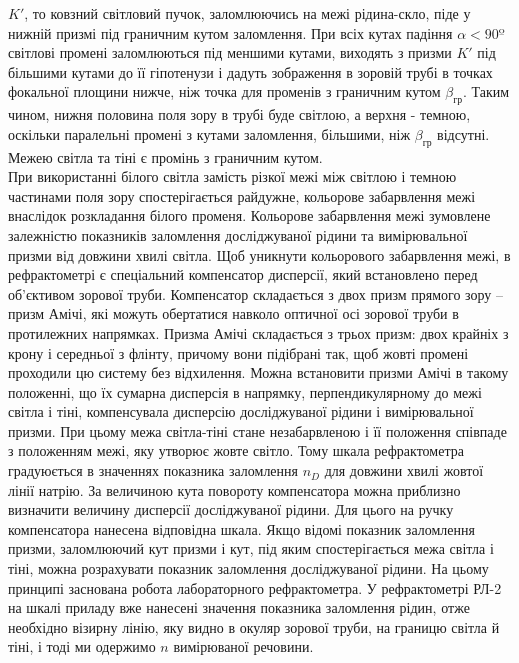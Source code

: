 $K'$, то ковзний світловий пучок, заломлюючись на межі рідина-скло, піде у нижній призмі під граничним кутом заломлення. При всіх кутах падіння $\alpha<90º$ світлові промені заломлюються під меншими кутами, виходять з призми $K'$ під більшими кутами до її гіпотенузи і дадуть зображення в зоровій трубі в точках фокальної площини нижче, ніж точка для променів з граничним кутом ${\beta}_{гр}$. Таким чином, нижня половина поля зору в трубі буде світлою, а верхня - темною, оскільки паралельні промені з кутами заломлення, більшими, ніж ${\beta}_{гр}$ відсутні. Межею світла та тіні є промінь з
граничним кутом. \\
При використанні білого світла замість різкої межі між світлою і темною частинами поля зору спостерігається райдужне, кольорове забарвлення межі внаслідок розкладання білого променя. Кольорове забарвлення межі зумовлене залежністю показників заломлення досліджуваної рідини та вимірювальної призми від довжини хвилі світла.
Щоб уникнути кольорового забарвлення межі, в рефрактометрі є спеціальний компенсатор дисперсії, який встановлено перед об’єктивом зорової труби. Компенсатор складається з двох призм прямого зору – призм Амічі, які можуть обертатися навколо оптичної осі зорової труби в протилежних напрямках. Призма Амічі складається з трьох призм: двох крайніх з крону і середньої з флінту, причому вони підібрані так, щоб жовті промені проходили цю систему без відхилення. Можна встановити призми Амічі в такому положенні, що їх сумарна дисперсія в напрямку, перпендикулярному до межі світла і тіні, компенсувала дисперсію досліджуваної рідини і вимірювальної призми. При цьому межа світла-тіні стане незабарвленою і її положення співпаде з положенням межі, яку утворює жовте світло. Тому шкала рефрактометра градуюється
в значеннях показника заломлення $n_D$ для довжини хвилі жовтої лінії натрію. За величиною кута повороту компенсатора можна приблизно визначити величину дисперсії досліджуваної рідини. Для цього на ручку компенсатора нанесена відповідна шкала. Якщо відомі показник заломлення призми, заломлюючий кут призми і кут, під яким
спостерігається межа світла і тіні, можна розрахувати показник заломлення досліджуваної рідини. На цьому принципі заснована робота лабораторного рефрактометра. У рефрактометрі РЛ-2 на шкалі приладу вже нанесені значення показника заломлення рідин, отже необхідно
візирну лінію, яку видно в окуляр зорової труби, на границю світла й тіні, і тоді ми одержимо $n$ вимірюваної речовини.





